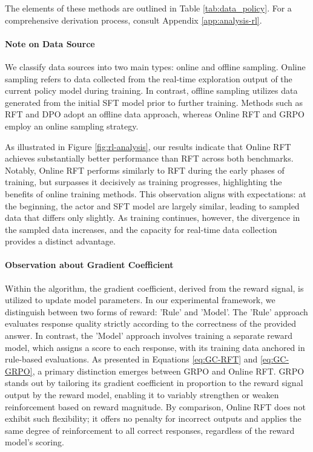 \begin{itemize}[topsep=0pt]
The elements of these methods are outlined in Table \ref{tab:data_policy}. For a comprehensive derivation process, consult Appendix \ref{app:analysis-rl}.

\paragraph{Note on Data Source} We classify data sources into two main types: online and offline sampling. Online sampling refers to data collected from the real-time exploration output of the current policy model during training. In contrast, offline sampling utilizes data generated from the initial SFT model prior to further training. Methods such as RFT and DPO adopt an offline data approach, whereas Online RFT and GRPO employ an online sampling strategy.

As illustrated in Figure \ref{fig:rl-analysis}, our results indicate that Online RFT achieves substantially better performance than RFT across both benchmarks. Notably, Online RFT performs similarly to RFT during the early phases of training, but surpasses it decisively as training progresses, highlighting the benefits of online training methods. This observation aligns with expectations: at the beginning, the actor and SFT model are largely similar, leading to sampled data that differs only slightly. As training continues, however, the divergence in the sampled data increases, and the capacity for real-time data collection provides a distinct advantage.

\paragraph{Observation about Gradient Coefficient} Within the algorithm, the gradient coefficient, derived from the reward signal, is utilized to update model parameters. In our experimental framework, we distinguish between two forms of reward: 'Rule' and 'Model'. The 'Rule' approach evaluates response quality strictly according to the correctness of the provided answer. In contrast, the 'Model' approach involves training a separate reward model, which assigns a score to each response, with its training data anchored in rule-based evaluations. As presented in Equations \ref{eq:GC-RFT} and \ref{eq:GC-GRPO}, a primary distinction emerges between GRPO and Online RFT. GRPO stands out by tailoring its gradient coefficient in proportion to the reward signal output by the reward model, enabling it to variably strengthen or weaken reinforcement based on reward magnitude. By comparison, Online RFT does not exhibit such flexibility; it offers no penalty for incorrect outputs and applies the same degree of reinforcement to all correct responses, regardless of the reward model's scoring.


\end{itemize}

